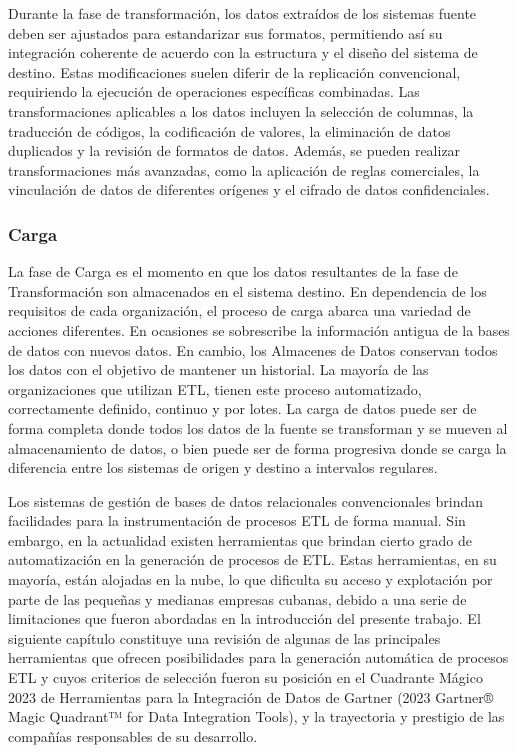Durante la fase de transformación, los datos extraídos de los sistemas fuente deben ser ajustados para estandarizar sus formatos, 
permitiendo así su integración coherente de acuerdo con la estructura y el diseño del sistema de destino. Estas modificaciones 
suelen diferir de la replicación convencional, requiriendo la ejecución de operaciones específicas combinadas. Las 
transformaciones aplicables a los datos incluyen la selección de columnas, la traducción de códigos, la codificación 
de valores, la eliminación de datos duplicados y la revisión de formatos de datos. Además, se pueden realizar 
transformaciones más avanzadas, como la aplicación de reglas comerciales, la vinculación de datos de diferentes 
orígenes y el cifrado de datos confidenciales.


\subsubsection{Carga}

La fase de Carga es el momento en que los datos resultantes de la fase de Transformaci\'on son almacenados en el sistema destino. 
En dependencia de los requisitos de cada organización, el proceso de carga abarca una variedad de acciones diferentes. 
En ocasiones se sobrescribe la información antigua de la bases de datos con nuevos datos. En cambio, los Almacenes de Datos 
conservan todos los datos con el objetivo de mantener un historial. La mayoría de las organizaciones que utilizan ETL, 
tienen este proceso automatizado, correctamente definido, continuo y por lotes\cite{ETL_amazon}. La carga de datos puede
ser de forma completa donde todos los datos de la fuente se transforman y se mueven al almacenamiento de datos, o bien 
puede ser de forma progresiva donde se carga la diferencia entre los sistemas de origen y destino a intervalos regulares.

Los sistemas de gesti\'on de bases de datos relacionales convencionales brindan facilidades para la instrumentaci\'on 
de procesos ETL de forma manual. Sin embargo, en la actualidad existen herramientas que brindan cierto grado de 
automatizaci\'on en la generación de procesos de ETL. Estas herramientas, en su mayoría, est\'an alojadas en la 
nube, lo que dificulta su acceso y explotaci\'on por parte de las pequeñas y medianas empresas cubanas, debido 
a una serie de limitaciones que fueron abordadas en la introducci\'on del presente trabajo. El siguiente 
cap\'itulo constituye una revisi\'on de algunas de las principales herramientas que ofrecen posibilidades 
para la generación autom\'atica de procesos ETL y cuyos criterios de selecci\'on fueron su posici\'on en el 
Cuadrante M\'agico 2023 de Herramientas para la Integración de Datos de 
Gartner (2023 Gartner® Magic Quadrant™ for Data Integration Tools)\cite{magic_q}, y la trayectoria y prestigio 
de las compañ\'ias responsables de su desarrollo.